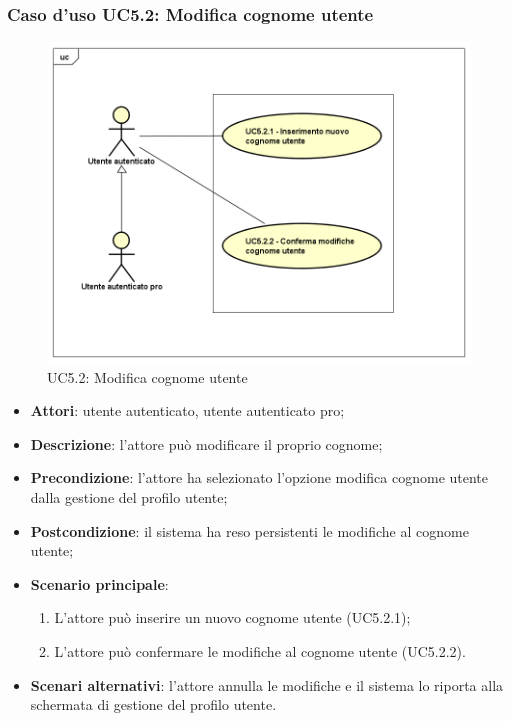 \subsubsection{Caso d'uso UC5.2: Modifica cognome utente}
\label{UC5.2}
\begin{figure}[h]
	\centering
	\includegraphics[scale=0.5,keepaspectratio]{UML/UC5_2.png}
	\caption{UC5.2: Modifica cognome utente}
\end{figure}
\begin{itemize}
	\item \textbf{Attori}: utente autenticato, utente autenticato pro;
	\item \textbf{Descrizione}: l'attore può modificare il proprio cognome;
	\item \textbf{Precondizione}: l'attore ha selezionato l'opzione modifica cognome utente dalla gestione del profilo utente; 
	\item \textbf{Postcondizione}: il sistema ha reso persistenti le modifiche al cognome utente;
	\item \textbf{Scenario principale}:
	\begin{enumerate}
		\item L'attore può inserire un nuovo cognome utente (UC5.2.1);
		\item L'attore può confermare le modifiche al cognome utente (UC5.2.2).
	\end{enumerate}
	\item \textbf{Scenari alternativi}: l'attore annulla le modifiche e il sistema lo riporta alla schermata di gestione del profilo utente.
\end{itemize}

